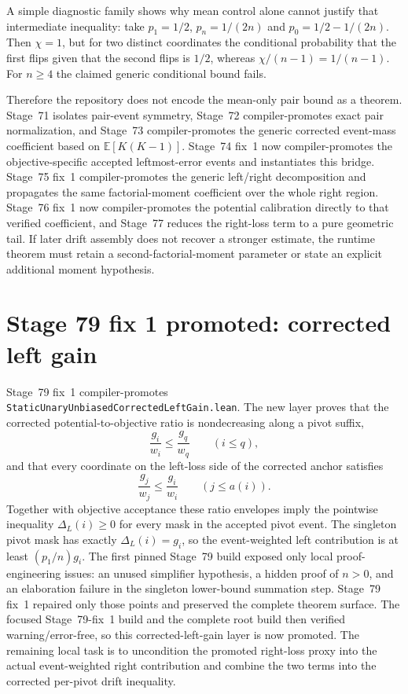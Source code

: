 \documentclass[11pt]{article}
\begin{document}
A simple diagnostic family shows why mean control alone cannot justify that intermediate inequality: take $p_1=1/2$, $p_n=1/(2n)$ and $p_0=1/2-1/(2n)$. Then $\chi=1$, but for two distinct coordinates the conditional probability that the first flips given that the second flips is $1/2$, whereas $\chi/(n-1)=1/(n-1)$. For $n\ge4$ the claimed generic conditional bound fails.

Therefore the repository does not encode the mean-only pair bound as a theorem. Stage~71 isolates pair-event symmetry, Stage~72 compiler-promotes exact pair normalization, and Stage~73 compiler-promotes the generic corrected event-mass coefficient based on $\mathbb E[K(K-1)]$. Stage~74 fix~1 now compiler-promotes the objective-specific accepted leftmost-error events and instantiates this bridge. Stage~75 fix~1 compiler-promotes the generic left/right decomposition and propagates the same factorial-moment coefficient over the whole right region. Stage~76 fix~1 now compiler-promotes the potential calibration directly to that verified coefficient, and Stage~77 reduces the right-loss term to a pure geometric tail. If later drift assembly does not recover a stronger estimate, the runtime theorem must retain a second-factorial-moment parameter or state an explicit additional moment hypothesis.

\section{Stage 79 fix 1 promoted: corrected left gain}

Stage~79 fix~1 compiler-promotes \texttt{StaticUnaryUnbiasedCorrectedLeftGain.lean}. The new layer proves
that the corrected potential-to-objective ratio is nondecreasing along a pivot suffix,
\[
  \frac{g_i}{w_i}\le \frac{g_q}{w_q}\qquad(i\le q),
\]
and that every coordinate on the left-loss side of the corrected anchor satisfies
\[
  \frac{g_j}{w_j}\le \frac{g_i}{w_i}\qquad(j\le a(i)).
\]
Together with objective acceptance these ratio envelopes imply the pointwise inequality
$\Delta_L(i)\ge0$ for every mask in the accepted pivot event.  The singleton pivot mask
has exactly $\Delta_L(i)=g_i$, so the event-weighted left contribution is at least
$(p_1/n)g_i$.  The first pinned Stage~79 build exposed only local proof-engineering
issues: an unused simplifier hypothesis, a hidden proof of $n>0$, and an elaboration
failure in the singleton lower-bound summation step. Stage~79 fix~1 repaired only those
points and preserved the complete theorem surface. The focused Stage~79-fix~1 build and
the complete root build then verified warning/error-free, so this corrected-left-gain
layer is now promoted. The remaining local task is to uncondition the promoted right-loss
proxy into the actual event-weighted right contribution and combine the two terms into
the corrected per-pivot drift inequality.
\end{document}
